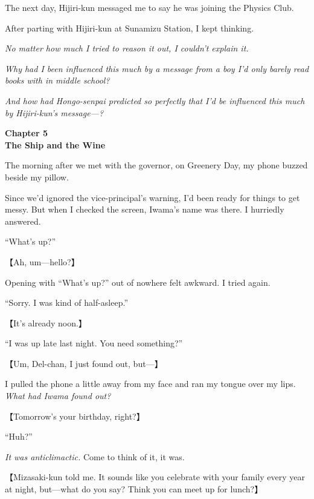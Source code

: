 \documentclass[
    a4paper,
    12pt,
    twoside,
    openany,
    UTF8,
    fontset=windows
]{ctexbook}
\begin{document}
The next day, Hijiri-kun messaged me to say he was joining the Physics Club.

After parting with Hijiri-kun at Sunamizu Station, I kept thinking.

\textit{No matter how much I tried to reason it out, I couldn't explain it.}

\textit{Why had I been influenced this much by a message from a boy I'd only barely read books with in middle school?}

\textit{And how had Hongo-senpai predicted so perfectly that I'd be influenced this much by Hijiri-kun's message---?}


\clearpage
\thispagestyle{plain}
\begin{center}
    \large\bfseries
    Chapter 5\\
    The Ship and the Wine
\end{center}
\label{sec:ch5V2}
\vspace{1cm}

The morning after we met with the governor, on Greenery Day, my phone buzzed beside my pillow.

Since we'd ignored the vice-principal's warning, I'd been ready for things to get messy. But when I checked the screen, Iwama's name was there. I hurriedly answered.

``What's up?''

【Ah, um---hello?】

Opening with ``What's up?'' out of nowhere felt awkward. I tried again.

``Sorry. I was kind of half-asleep.''

【It's already noon.】

``I was up late last night. You need something?''

【Um, Del-chan, I just found out, but---】

I pulled the phone a little away from my face and ran my tongue over my lips. \textit{What had Iwama found out?}

【Tomorrow's your birthday, right?】

``Huh?''

\textit{It was anticlimactic.} Come to think of it, it was.

【Mizasaki-kun told me. It sounds like you celebrate with your family every year at night, but---what do you say? Think you can meet up for lunch?】
\end{document}
